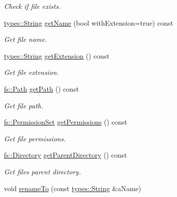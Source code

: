 \begin{DoxyCompactItemize}
\begin{DoxyCompactList}\small\item\em Check if file exists. \end{DoxyCompactList}\item 
\hyperlink{classlibrary_1_1core_1_1types_1_1_string}{types\+::\+String} \hyperlink{classlibrary_1_1core_1_1fs_1_1_file_affd399abd971505b424d7ced3d43c61d}{get\+Name} (bool with\+Extension=true) const
\begin{DoxyCompactList}\small\item\em Get file name. \end{DoxyCompactList}\item 
\hyperlink{classlibrary_1_1core_1_1types_1_1_string}{types\+::\+String} \hyperlink{classlibrary_1_1core_1_1fs_1_1_file_a157085065abfb37e58a1d5ea44eb96e8}{get\+Extension} () const
\begin{DoxyCompactList}\small\item\em Get file extension. \end{DoxyCompactList}\item 
\hyperlink{classlibrary_1_1core_1_1fs_1_1_path}{fs\+::\+Path} \hyperlink{classlibrary_1_1core_1_1fs_1_1_file_a70b1380ff844adf37a481bbdb46d11a0}{get\+Path} () const
\begin{DoxyCompactList}\small\item\em Get file path. \end{DoxyCompactList}\item 
\hyperlink{classlibrary_1_1core_1_1fs_1_1_permission_set}{fs\+::\+Permission\+Set} \hyperlink{classlibrary_1_1core_1_1fs_1_1_file_a0addf18f7510955e48fdef2416b98423}{get\+Permissions} () const
\begin{DoxyCompactList}\small\item\em Get file permissions. \end{DoxyCompactList}\item 
\hyperlink{classlibrary_1_1core_1_1fs_1_1_directory}{fs\+::\+Directory} \hyperlink{classlibrary_1_1core_1_1fs_1_1_file_a8eb74097f9bdc9d3c626fe4924bf405e}{get\+Parent\+Directory} () const
\begin{DoxyCompactList}\small\item\em Get file\textquotesingle{}s parent directory. \end{DoxyCompactList}\item 
void \hyperlink{classlibrary_1_1core_1_1fs_1_1_file_ad2a6b7b5dc95d7a00c9e6dbc92eff4d9}{rename\+To} (const \hyperlink{classlibrary_1_1core_1_1types_1_1_string}{types\+::\+String} \&a\+Name)

\end{DoxyCompactItemize}
